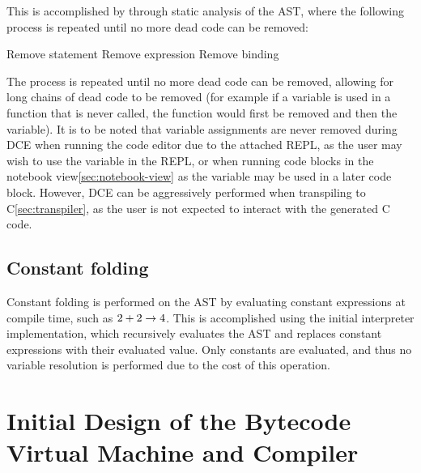 This is accomplished by through static analysis of the AST, where the following process is repeated until no more dead
code can be removed:

\begin{algorithmic}
                    \State Remove statement
                \EndIf
                    \State Remove expression
                \EndIf
                    \State Remove binding
                \EndIf
            \EndIf
        \EndFor
    \EndWhile
\end{algorithmic}

The process is repeated until no more dead code can be removed, allowing for long chains of dead code to be 
removed (for example if a variable is used in a function that is never called, the function would first be removed
and then the variable).
It is to be noted that variable assignments are never removed during DCE when running the code editor due to the 
attached REPL, as the user may wish to use the variable in the REPL\@, or when running code blocks in the notebook 
view\ref{sec:notebook-view} as the variable may be used in a later code block.
However, DCE can be aggressively performed when transpiling to C\ref{sec:transpiler}, as the user is not expected to 
interact with the generated C code.

\subsection{Constant folding}\label{subsec:constant-folding}

Constant folding is performed on the AST by evaluating constant expressions at compile time, such as $2 + 2 \rightarrow 4$.
This is accomplished using the initial interpreter implementation, which recursively evaluates the AST and replaces
constant expressions with their evaluated value.
Only constants are evaluated, and thus no variable resolution is performed due to the cost of this operation.

\section{Initial Design of the Bytecode Virtual Machine and Compiler}\label{sec:initial-design-of-the-bytecode-virtual-machine-and-compiler}

